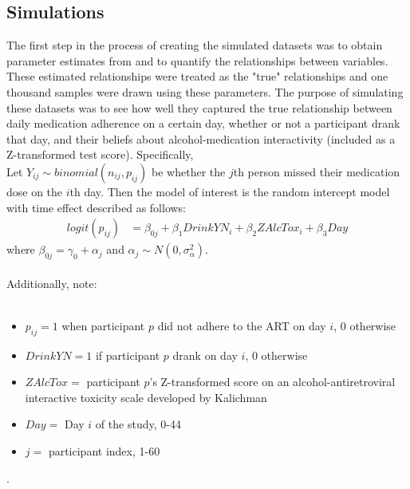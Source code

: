 \documentclass{svjour3}\usepackage[]{graphicx}\usepackage[]{color}
\begin{document}
\subsection{Simulations}
\label{sec:2.2}
The first step in the process of creating the simulated datasets was to obtain parameter estimates from \citet{pellowski2016alcohol} and to quantify the relationships between variables. These estimated relationships were treated as the "true" relationships and one thousand samples were drawn using these parameters. The purpose of simulating these datasets was to see how well they captured the true relationship between daily medication adherence on a certain day, whether or not a participant drank that day, and their beliefs about alcohol-medication interactivity (included as a Z-transformed test score). Specifically, \\

Let $Y_{ij} \sim binomial(n_{ij},p_{ij})$ be whether the $j$th person missed their medication dose on the $i$th day. Then the model of interest is the random intercept model with time effect described as follows:
\begin{align*}
logit(p_{ij}) &= \beta_{0j} + \beta_1DrinkYN_i + \beta_2ZAlcTox_i +\beta_3Day
\end{align*}
where $\beta_{0j} = \gamma_0 + \alpha_j$ and $\alpha_j \sim N(0,\sigma_\alpha^2)$. \\ \\ 
Additionally, note: \\ \\
\begin{itemize}
\item $p_{ij} = 1$ when participant $p$ did not adhere to the ART on day $i$, 0 otherwise \\
\item $DrinkYN = 1$ if participant $p$  drank on day $i$, 0 otherwise\\
\item $ZAlcTox =$ participant $p$'s Z-transformed score on an alcohol-antiretroviral interactive toxicity scale developed by Kalichman \cite{kalichman2009prevalence} \\
\item $Day =$ Day $i$ of the study, 0-44 \\
\item $j =$ participant index, 1-60 \\
\end{itemize}.
\end{document}
